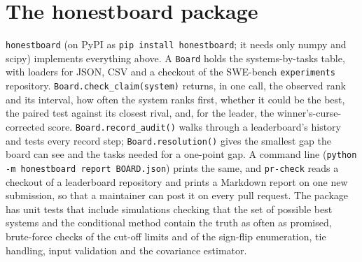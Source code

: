 \documentclass[11pt]{article}
\begin{document}
\section{The honestboard package}\label{sec:tool}
\texttt{honestboard} (on PyPI as \texttt{pip install honestboard}; it needs only numpy and scipy) implements everything above.
A \texttt{Board} holds the systems-by-tasks table, with loaders for JSON, CSV and a checkout of the SWE-bench \texttt{experiments} repository.
\texttt{Board.check\_claim(system)} returns, in one call, the observed rank and its interval, how often the system ranks first, whether it could be the best, the paired test against its closest rival, and, for the leader, the winner's-curse-corrected score.
\texttt{Board.record\_audit()} walks through a leaderboard's history and tests every record step; \texttt{Board.resolution()} gives the smallest gap the board can see and the tasks needed for a one-point gap.
A command line (\texttt{python -m honestboard report BOARD.json}) prints the same, and \texttt{pr-check} reads a checkout of a leaderboard repository and prints a Markdown report on one new submission, so that a maintainer can post it on every pull request.
The package has unit tests that include simulations checking that the set of possible best systems and the conditional method contain the truth as often as promised, brute-force checks of the cut-off limits and of the sign-flip enumeration, tie handling, input validation and the covariance estimator.
\end{document}
